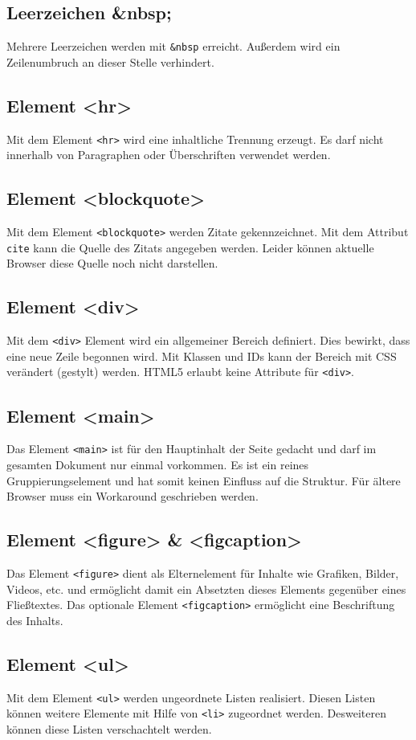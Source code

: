 \subsection{Leerzeichen \&nbsp;}
Mehrere Leerzeichen werden mit \texttt{\&nbsp} erreicht. Außerdem wird ein Zeilenumbruch an dieser Stelle verhindert.
\subsection{Element <hr>}
Mit dem Element \texttt{<hr>} wird eine inhaltliche Trennung erzeugt. Es darf nicht innerhalb von Paragraphen oder Überschriften verwendet werden.
\subsection{Element <blockquote>}
Mit dem Element \texttt{<blockquote>} werden Zitate gekennzeichnet. Mit dem Attribut \texttt{cite} kann die Quelle des Zitats angegeben werden. Leider können aktuelle Browser diese Quelle noch nicht darstellen.
\subsection{Element <div>}
Mit dem \texttt{<div>} Element wird ein allgemeiner Bereich definiert. Dies bewirkt, dass eine neue Zeile begonnen wird. Mit Klassen und IDs kann der Bereich mit CSS verändert (gestylt) werden. HTML5 erlaubt keine Attribute für \texttt{<div>}.
\subsection{Element <main>}
Das Element \texttt{<main>}  ist für den Hauptinhalt der Seite gedacht und darf im gesamten Dokument nur einmal vorkommen. Es ist ein reines Gruppierungselement und hat somit keinen Einfluss auf die Struktur. Für ältere Browser muss ein Workaround geschrieben werden.
\subsection{Element <figure> \& <figcaption>}
Das Element \texttt{<figure>} dient als Elternelement für Inhalte wie Grafiken, Bilder, Videos, etc. und ermöglicht damit ein Absetzten dieses Elements gegenüber eines Fließtextes. Das optionale Element \texttt{<figcaption>} ermöglicht eine Beschriftung des Inhalts.
\subsection{Element <ul>}
Mit dem Element \texttt{<ul>} werden ungeordnete Listen realisiert. Diesen Listen können weitere Elemente mit Hilfe von \texttt{<li>} zugeordnet werden. Desweiteren können diese Listen verschachtelt werden.
